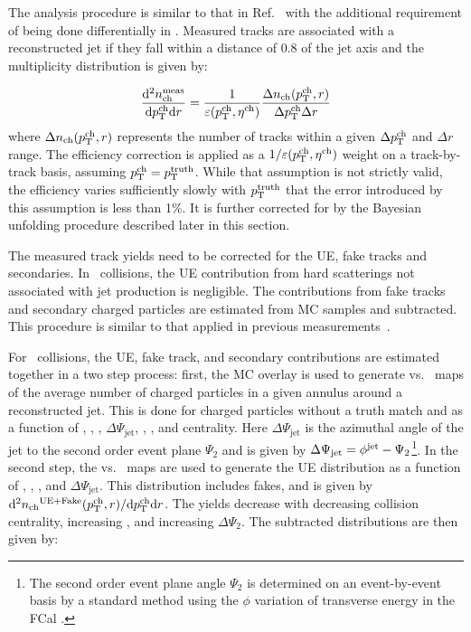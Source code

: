 
The analysis procedure is similar to that in Ref.~\cite{Aaboud:2018hpb} with the additional requirement of being done differentially in \rvar.
Measured tracks are associated with a reconstructed jet if they fall within a distance of $0.8$ of the jet axis and the multiplicity distribution is given by:

\begin{align*}
\dfrac{\mathrm{d}^{2} \mbox{$n_{\mathrm{ch}}^{\mathrm{meas}}$} }{ \mathrm{d} \mbox{$p_{\mathrm{T}}^{\mathrm{ch}}$} \mathrm{d} r} = \frac{1}{\varepsilon(\mbox{$p_{\mathrm{T}}^{\mathrm{ch}}$},\mbox{$\eta^{\mathrm{ch}}$})} \frac{\Delta \mbox{$n_{\mathrm{ch}}$}( \mbox{$p_{\mathrm{T}}^{\mathrm{ch}}$}, r)}{ \Delta\mbox{$p_{\mathrm{T}}^{\mathrm{ch}}$} \Delta r}
\end{align*}
where $\Delta \mbox{$n_{\mathrm{ch}}$} (\mbox{$p_{\mathrm{T}}^{\mathrm{ch}}$}, r)$ represents the number of tracks within a given $\Delta \mbox{$p_{\mathrm{T}}^{\mathrm{ch}}$}$ and $\Delta r$ range.
The efficiency correction is applied as a $1/\varepsilon(\mbox{$p_{\mathrm{T}}^{\mathrm{ch}}$},\mbox{$\eta^{\mathrm{ch}}$})$ weight on a track-by-track basis, assuming $\mbox{$p_{\mathrm{T}}^{\mathrm{ch}}$} = \mbox{$p_{\mathrm{T}}^{\mathrm{truth}}$}$.
While that assumption is not strictly valid, the efficiency varies sufficiently slowly with $\mbox{$p_{\mathrm{T}}^{\mathrm{truth}}$}$ that the error introduced by this assumption is less than 1\%.
It is further corrected for by the Bayesian unfolding procedure described later in this section.

The measured track yields need to be corrected for the UE, fake tracks and secondaries.
In \pp\ collisions, the UE contribution from hard scatterings not associated with jet production is negligible.
The contributions from fake tracks and secondary charged particles are estimated from MC samples and subtracted.
This procedure is similar to that applied in previous measurements~\cite{Aaboud:2017tke,Aaboud:2018hpb}.


For \pbpb\ collisions, the UE, fake track, and secondary contributions are estimated together in a two step process: 
first, the MC overlay is used to generate \etajet vs. \phijet\ maps of the average number of charged particles in a given annulus around a reconstructed jet.
This is done for charged particles without a truth match and as a function of \ptjet, \etajet, \phijet,  $\Delta\Psi_{\mathrm{jet}}$, \rvar, \pttrk, and centrality.
Here $\Delta\Psi_{\mathrm{jet}}$ is the azimuthal angle of the jet to the second order event plane $\Psi_2$ and is given by $ \Delta\Psi_{\mathrm{jet}} = \mbox{$\phi^{\mathrm{jet}}$} - \Psi_2$\footnote{The second order event plane angle $\Psi_2$ is determined on an event-by-event basis by a standard method using the $\phi$ variation of transverse energy in the FCal \cite{ATLAS:2012at}.}.
In the second step, the \etajet vs. \phijet\ maps are used to generate the UE distribution as a function of \ptjet, \etajet, \phijet, and $\Delta\Psi_{\mathrm{jet}}$.
This distribution includes fakes, and is given by \mbox{$\mathrm{d}^2 \mbox{$n_{\mathrm{ch}}$}^{\mathrm{UE+Fake}}(\mbox{$p_{\mathrm{T}}^{\mathrm{ch}}$}, r) / \mathrm{d} \mbox{$p_{\mathrm{T}}^{\mathrm{ch}}$} \mathrm{d} r$}.
The yields decrease with decreasing collision centrality, increasing \pttrk, and increasing $\Delta\Psi_2$.
The subtracted distributions are then given by:

